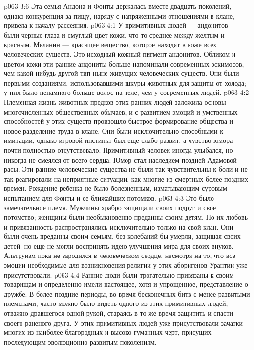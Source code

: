 \vs p063 3:6 \pc Эта семья Андона и Фонты держалась вместе двадцать поколений, однако конкуренция за пищу, наряду с напряженными отношениями в клане, привела к началу рассеяния.
\vs p063 4:1 У примитивных людей --- андонитов --- были черные глаза и смуглый цвет кожи, что\hyp{}то среднее между желтым и красным. Меланин --- красящее вещество, которое находят в коже всех человеческих существ. Это исходный кожный пигмент андонитов. Обликом и цветом кожи эти ранние андониты больше напоминали современных эскимосов, чем какой\hyp{}нибудь другой тип ныне живущих человеческих существ. Они были первыми созданиями, использовавшими шкуры животных для защиты от холода; у них было ненамного больше волос на теле, чем у современных людей.
\vs p063 4:2 Племенная жизнь животных предков этих ранних людей заложила основы многочисленных общественных обычаев, и с развитием эмоций и умственных способностей у этих существ произошло быстрое формирование общества и новое разделение труда в клане. Они были исключительно способными к имитации, однако игровой инстинкт был еще слабо развит, а чувство юмора почти полностью отсутствовало. Примитивный человек иногда улыбался, но никогда не смеялся от всего сердца. Юмор стал наследием поздней Адамовой расы. Эти ранние человеческие существа не были так чувствительны к боли и не так реагировали на неприятные ситуации, как многие из смертных более поздних времен. Рождение ребенка не было болезненным, изматывающим суровым испытанием для Фонты и ее ближайших потомков.
\vs p063 4:3 \pc Это было замечательное племя. Мужчины храбро защищали своих подруг и свое потомство; женщины были необыкновенно преданны своим детям. Но их любовь и привязанность распространялись исключительно только на свой клан. Они были очень преданны своим семьям, без колебаний бы умерли, защищая своих детей, но еще не могли воспринять идею улучшения мира для своих внуков. Альтруизм пока не зародился в человеческом сердце, несмотря на то, что все эмоции необходимые для возникновения религии у этих аборигенов Урантии уже присутствовали.
\vs p063 4:4 Ранние люди были трогательно привязаны к своим товарищам и определенно имели настоящее, хотя и упрощенное, представление о дружбе. В более поздние периоды, во время бесконечных битв с менее развитыми племенами, часто можно было видеть одного из этих примитивных людей, отважно дравшегося одной рукой, стараясь в то же время защитить и спасти своего раненого друга. У этих примитивных людей уже присутствовали зачатки многих из наиболее благородных и высоко гуманных черт, присущих последующим эволюционно развитым поколениям.
